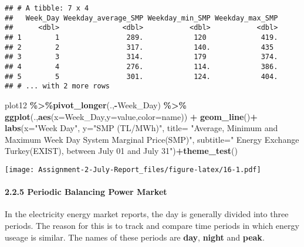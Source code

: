 \documentclass[
]{article}
\newenvironment{Shaded}{\begin{snugshade}}{\end{snugshade}}
\newcommand{\DataTypeTok}[1]{\textcolor[rgb]{0.13,0.29,0.53}{#1}}
\newcommand{\KeywordTok}[1]{\textcolor[rgb]{0.13,0.29,0.53}{\textbf{#1}}}
\newcommand{\NormalTok}[1]{#1}
\newcommand{\OperatorTok}[1]{\textcolor[rgb]{0.81,0.36,0.00}{\textbf{#1}}}
\newcommand{\StringTok}[1]{\textcolor[rgb]{0.31,0.60,0.02}{#1}}
\begin{document}
\begin{verbatim}
## # A tibble: 7 x 4
##   Week_Day Weekday_average_SMP Weekday_min_SMP Weekday_max_SMP
##      <dbl>               <dbl>           <dbl>           <dbl>
## 1        1                289.            120             419.
## 2        2                317.            140.            435 
## 3        3                314.            179             374.
## 4        4                276.            114.            386.
## 5        5                301.            124.            404.
## # ... with 2 more rows
\end{verbatim}

\begin{Shaded}
\begin{Highlighting}[]
\NormalTok{plot12 }\OperatorTok{\%\textgreater{}\%}\KeywordTok{pivot\_longer}\NormalTok{(.,}\OperatorTok{{-}}\NormalTok{Week\_Day) }\OperatorTok{\%\textgreater{}\%}\StringTok{ }\KeywordTok{ggplot}\NormalTok{(.,}\KeywordTok{aes}\NormalTok{(}\DataTypeTok{x=}\NormalTok{Week\_Day,}\DataTypeTok{y=}\NormalTok{value,}\DataTypeTok{color=}\NormalTok{name)) }\OperatorTok{+}\StringTok{ }\KeywordTok{geom\_line}\NormalTok{()}\OperatorTok{+}
\StringTok{      }\KeywordTok{labs}\NormalTok{(}\DataTypeTok{x=}\StringTok{"Week Day"}\NormalTok{, }\DataTypeTok{y=}\StringTok{"SMP (TL/MWh)"}\NormalTok{, }
           \DataTypeTok{title=}  \StringTok{"Average, Minimum and Maximum Week Day System Marginal Price(SMP)"}\NormalTok{,}
           \DataTypeTok{subtitle=}\StringTok{" Energy Exchange Turkey(EXIST), between July 01 and July 31"}\NormalTok{)}\OperatorTok{+}\KeywordTok{theme\_test}\NormalTok{()}
\end{Highlighting}
\end{Shaded}

\texttt{[image: Assignment-2-July-Report\_files/figure-latex/16-1.pdf]}

\hypertarget{periodic-balancing-power-market}{%
\paragraph{2.2.5 Periodic Balancing Power
Market}\label{periodic-balancing-power-market}}

In the electricity energy market reports, the day is generally divided
into three periods. The reason for this is to track and compare time
periods in which energy useage is similar. The names of these periods
are \textbf{day}, \textbf{night} and \textbf{peak}.
\end{document}
